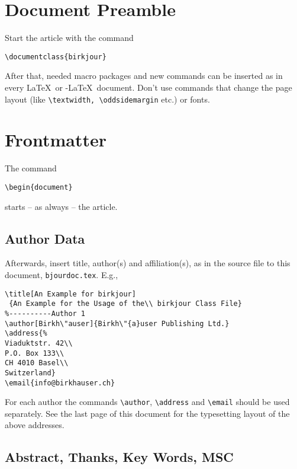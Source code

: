 \documentclass{birkjour}
\theoremstyle{definition}
\theoremstyle{remark}
\numberwithin{equation}{section}
\begin{document}
\section{Document Preamble}
Start the article with the command

\begin{verbatim}\documentclass{birkjour}\end{verbatim}

After that, needed macro packages and new commands can be inserted
as in every \LaTeX\ or \AmS-\LaTeX\ document. Don't use commands
that change the page layout (like
\verb+\textwidth, \oddsidemargin+
etc.) or fonts.\bigskip

\section{Frontmatter}
The command
\begin{verbatim}\begin{document}\end{verbatim}
starts -- as always -- the article.

\subsection{Author Data}

Afterwards, insert title, author(s) and affiliation(s), as in the source file to this document,
\verb+bjourdoc.tex+. E.g.,
\begin{verbatim}
\title[An Example for birkjour]
 {An Example for the Usage of the\\ birkjour Class File}
%----------Author 1
\author[Birkh\"auser]{Birkh\"{a}user Publishing Ltd.}
\address{%
Viaduktstr. 42\\
P.O. Box 133\\
CH 4010 Basel\\
Switzerland}
\email{info@birkhauser.ch}
\end{verbatim}
For each author the commands \verb+\author+, \verb+\address+ and \verb+\email+ should be used separately. See the last page of this document for the typesetting layout of the above addresses.

\subsection{Abstract, Thanks, Key Words, MSC}
\end{document}

